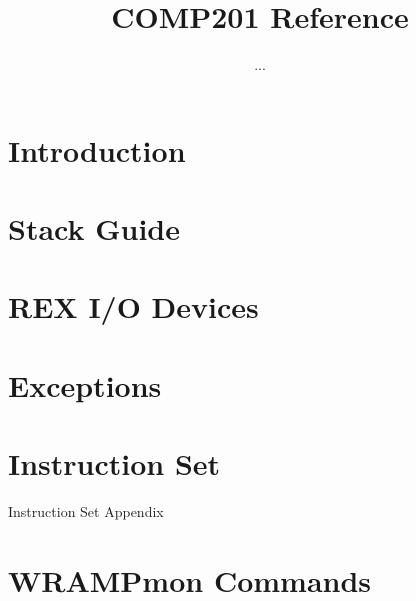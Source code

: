 \documentclass[a4paper]{book}
\title{COMP201 Reference}
\author{...}
\begin{document}
\maketitle
\tableofcontents

\chapter{Introduction}
\label{chapter:intro}

\chapter{Stack Guide}
\label{chapter:stack}

\chapter{REX I/O Devices}
\label{chapter:io}

\chapter{Exceptions}
\label{chapter:exceptions}

\appendix
\chapter{Instruction Set}
\label{appendix:instr}
%

Instruction Set Appendix 
\chapter{WRAMPmon Commands}
\label{appendix:wrampmon}

\end{document}

